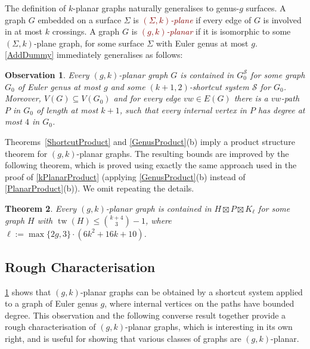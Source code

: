 \documentclass{patmorin}
\theoremstyle{plain}
\newtheorem{thm}{Theorem}
\newtheorem{obs}[thm]{Observation}
\theoremstyle{definition}
\newcommand{\defin}[1]{\textcolor{Maroon}{\emph{#1}}}
\newcommand{\note}[2]{\noindent{\color{red}[#1:~#2]}}
\DeclareMathOperator{\tw}{tw}
\renewcommand{\SS}{\mathcal{S}}
\renewcommand{\leq}{\leqslant}
\begin{document}
The definition of $k$-planar graphs naturally generalises to genus-$g$ surfaces. A graph $G$ embedded on a surface $\Sigma$ is \defin{$(\Sigma,k)$-plane} if every edge of $G$ is involved in at most $k$ crossings.  A graph $G$ is \defin{$(g,k)$-planar} if it is isomorphic to some $(\Sigma,k)$-plane graph, for some surface $\Sigma$ with Euler genus at most $g$. \cref{AddDummy} immediately generalises as follows:

\begin{obs}
\label{gAddDummy}
Every $(g,k)$-planar graph $G$ is contained in $G_0^\SS$ for some graph $G_0$ of Euler genus at most $g$ and some $(k+1,2)$-shortcut system $\SS$ for $G_0$. Moreover, $V(G) \subseteq V(G_0)$ and for every edge $vw \in E(G)$ there is a $vw$-path $P$ in $G_0$ of length at most $k+1$, such that every internal vertex in $P$ has degree at most $4$ in $G_0$.
\end{obs}

Theorems~\ref{ShortcutProduct}  and \ref{GenusProduct}(b) imply a product structure theorem for $(g,k)$-planar graphs. The resulting bounds are improved by the following theorem, which is proved using exactly the same approach used in the proof of \cref{kPlanarProduct} (applying \cref{GenusProduct}(b) instead of \cref{PlanarProduct}(b)). We omit repeating the details.

\begin{thm}
\label{gkPlanarProduct}
Every $(g,k)$-planar graph is contained in $H\boxtimes P \boxtimes K_\ell$ for some graph $H$ with $\tw(H) \leq \binom{k+4}{3}-1$, where $\ell:=\max\{2g,3\}\cdot(6k^2+16k+10)$.
\end{thm}



\subsection{Rough Characterisation}
\label{Characterisation}

\cref{gAddDummy} shows that $(g,k)$-planar graphs can be obtained by a shortcut system applied to a graph of Euler genus $g$, where internal vertices on the paths have bounded degree. This observation and the following converse result together provide a rough characterisation of $(g,k)$-planar graphs, which is interesting in its own right, and is useful for showing that various classes of graphs are $(g,k)$-planar.
\end{document}
